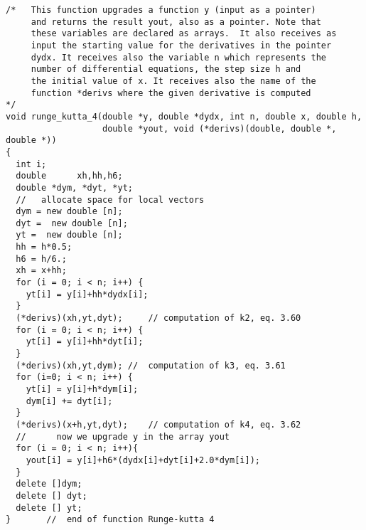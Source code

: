 \documentclass{beamer}
\begin{document}
\begin{frame}
\begin{block}{}
\begin{verbatim}
/*   This function upgrades a function y (input as a pointer)
     and returns the result yout, also as a pointer. Note that
     these variables are declared as arrays.  It also receives as
     input the starting value for the derivatives in the pointer
     dydx. It receives also the variable n which represents the 
     number of differential equations, the step size h and 
     the initial value of x. It receives also the name of the
     function *derivs where the given derivative is computed
*/
void runge_kutta_4(double *y, double *dydx, int n, double x, double h, 
                   double *yout, void (*derivs)(double, double *, double *))
{
  int i;
  double      xh,hh,h6; 
  double *dym, *dyt, *yt;
  //   allocate space for local vectors   
  dym = new double [n];
  dyt =  new double [n];
  yt =  new double [n];
  hh = h*0.5;
  h6 = h/6.;
  xh = x+hh;
  for (i = 0; i < n; i++) {
    yt[i] = y[i]+hh*dydx[i];
  }
  (*derivs)(xh,yt,dyt);     // computation of k2, eq. 3.60   
  for (i = 0; i < n; i++) {
    yt[i] = y[i]+hh*dyt[i];
  }
  (*derivs)(xh,yt,dym); //  computation of k3, eq. 3.61   
  for (i=0; i < n; i++) {
    yt[i] = y[i]+h*dym[i];
    dym[i] += dyt[i];
  }
  (*derivs)(x+h,yt,dyt);    // computation of k4, eq. 3.62   
  //      now we upgrade y in the array yout  
  for (i = 0; i < n; i++){
    yout[i] = y[i]+h6*(dydx[i]+dyt[i]+2.0*dym[i]);
  }
  delete []dym;
  delete [] dyt;
  delete [] yt;
}       //  end of function Runge-kutta 4  
\end{verbatim}
\end{block}
\end{frame}
\end{document}
